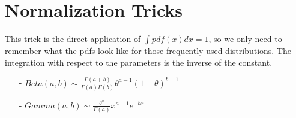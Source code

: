 \chapter{Normalization Tricks}
This trick is the direct application of $\int pdf(x) dx = 1$, so we only need to remember what the pdfs look like for those frequently used distributions. The integration with respect to the parameters is the inverse of the constant.

\begin{enumerate}
	\item[-] $Beta(a,b) \sim \frac{\Gamma(a+b)}{\Gamma(a)\Gamma(b)}\theta^{a-1}(1-\theta)^{b-1}$
	\item[-] $Gamma(a,b) \sim \frac{b^a}{\Gamma(a)}x^{a-1}e^{-bx}$
\end{enumerate}